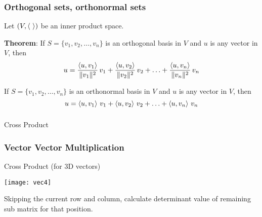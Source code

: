  \begin{frame}[fragile]\frametitle{Orthogonal sets, orthonormal sets}

Let $(V, \left<  \  \right>)$ be an inner product space.

\textbf{Theorem}:  If $S = \{ v_1, v_2, \ldots, v_n \}$ is an orthogonal basis in $V$ and $u$ is any vector in $V$, then
$$u = \frac{\left< u, v_1 \right>}{\lVert v_1\rVert^2} \, v_1 + \frac{\left< u, v_2 \right>}{\lVert v_2\rVert^2} \, v_2 + \ldots + \frac{\left< u, v_n \right>}{\lVert v_n\rVert^2} \, v_n$$

If $S = \{ v_1, v_2, \ldots, v_n \}$ is an orthonormal basis in $V$ and $u$ is any vector in $V$, then
$$u = \left< u, v_1 \right> \, v_1 + \left< u, v_2 \right> \, v_2  + \ldots + \left< u, v_n \right> \, v_n$$ 

\end{frame}


 \begin{frame}[fragile]\frametitle{}
\begin{center}
{\Large Cross Product}
\end{center}
\end{frame}


 \begin{frame}[fragile] \frametitle{Vector Vector Multiplication}
Cross Product (for 3D vectors)
\begin{center}
\texttt{[image: vec4]}
\end{center}
Skipping the current row and column, calculate determinant value of remaining sub matrix for that position.
\end{frame}


